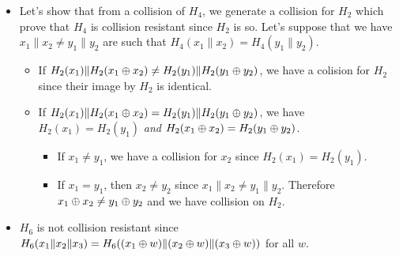 \begin{solution}
  \begin{itemize}
    \item
      Let's show that from a collision of $H_4$, we generate a collision for $H_2$
      which prove that $H_4$ is collision resistant since $H_2$ is so.
      Let's suppose that we have $x_1\|x_2 \neq y_1\|y_2$ are such that $H_4(x_1\|x_2) = H_4(y_1\|y_2)$.
      \begin{itemize}
        \item
          If $H_2(x_1) \| H_2(x_1 \oplus x_2) \neq H_2(y_1) \| H_2(y_1 \oplus y_2)$,
          we have a colision for $H_2$ since their image by $H_2$ is identical.
        \item
          If $H_2(x_1) \| H_2(x_1 \oplus x_2) = H_2(y_1) \| H_2(y_1 \oplus y_2)$,
          we have $H_2(x_1) = H_2(y_1)$ \emph{and} $H_2(x_1 \oplus x_2) = H_2(y_1 \oplus y_2)$.
          \begin{itemize}
            \item If $x_1 \neq y_1$, we have a collision for $x_2$ since $H_2(x_1) = H_2(y_1)$.
            \item If $x_1 = y_1$, then $x_2 \neq y_2$ since $x_1\|x_2 \neq y_1\|y_2$.
              Therefore $x_1 \oplus x_2 \neq y_1 \oplus y_2$ and we have collision on $H_2$.
          \end{itemize}
      \end{itemize}
    \item
      $H_6$ is not collision resistant since $H_6(x_1\|x_2\|x_3) = H_6((x_1 \oplus w)\|(x_2 \oplus w)\|(x_3 \oplus w))$
      for all $w$.
  \end{itemize}
\end{solution}

